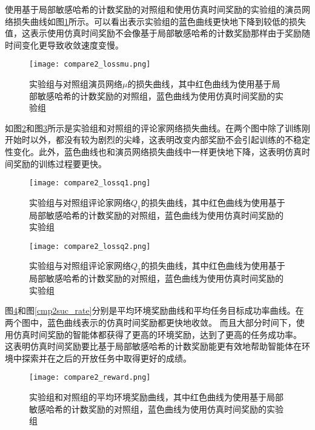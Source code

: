 使用基于局部敏感哈希的计数奖励的对照组和使用仿真时间奖励的实验组的演员网络损失曲线如图\ref{cmp2lossmu}所示。可以看出表示实验组的蓝色曲线更快地下降到较低的损失值，这表示使用仿真时间奖励不会像基于局部敏感哈希的计数奖励那样由于奖励随时间变化更导致收敛速度变慢。

        \begin{figure}[htpb]
        \centering
        \texttt{[image: compare2\_lossmu.png]}
        \caption{实验组与对照组演员网络$\mu$的损失曲线，其中红色曲线为使用基于局部敏感哈希的计数奖励的对照组，蓝色曲线为使用仿真时间奖励的实验组}
            \label{cmp2lossmu}
        \end{figure}

如图\ref{cmp2lossq1}和图\ref{cmp2lossq2}所示是实验组和对照组的评论家网络损失曲线。在两个图中除了训练刚开始时以外，都没有较为剧烈的尖峰，这表明改变内部奖励不会引起训练的不稳定性变化。此外，蓝色曲线也和演员网络损失曲线中一样更快地下降，这表明仿真时间奖励的训练过程要更快。

        \begin{figure}[htpb]
        \centering
        \texttt{[image: compare2\_lossq1.png]}
        \caption{实验组与对照组评论家网络$Q_1$的损失曲线，其中红色曲线为使用基于局部敏感哈希的计数奖励的对照组，蓝色曲线为使用仿真时间奖励的实验组}
            \label{cmp2lossq1}
        \end{figure}

        \begin{figure}[htpb]
        \centering
        \texttt{[image: compare2\_lossq2.png]}
        \caption{实验组与对照组评论家网络$Q_2$的损失曲线，其中红色曲线为使用基于局部敏感哈希的计数奖励的对照组，蓝色曲线为使用仿真时间奖励的实验组}
            \label{cmp2lossq2}
        \end{figure}

图\ref{cmp2env_reward}和图\ref{cmp2suc_rate}分别是平均环境奖励曲线和平均任务目标成功率曲线。在两个图中，蓝色曲线表示的仿真时间奖励都更快地收敛。
而且大部分时间下，使用仿真时间奖励的智能体都获得了更高的环境奖励，达到了更高的任务成功率。
这表明仿真时间奖励要比基于局部敏感哈希的计数奖励能更有效地帮助智能体在环境中探索并在之后的开放任务中取得更好的成绩。
        \begin{figure}[htpb]
        \centering
        \texttt{[image: compare2\_reward.png]}
        \caption{实验组和对照组的平均环境奖励曲线，其中红色曲线为使用基于局部敏感哈希的计数奖励的对照组，蓝色曲线为使用仿真时间奖励的实验组}
            \label{cmp2env_reward}
        \end{figure}

